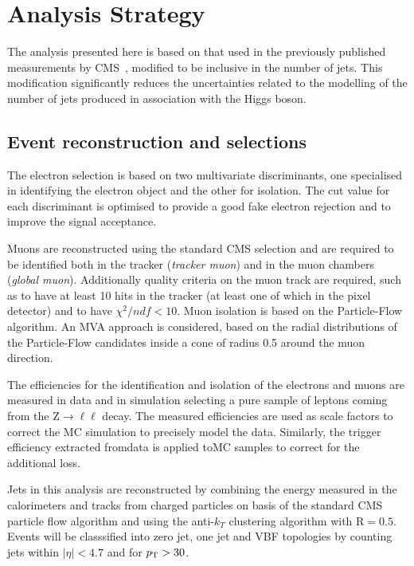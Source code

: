 \section{Analysis Strategy}
\label{sec:AnalysisStrategy}

The analysis presented here is based on that used in the previously published \hwwllnn{}
measurements by CMS~\cite{Chatrchyan:2013iaa}, modified to be inclusive in the number of jets. 
This modification significantly reduces the uncertainties related to the modelling of the number of jets produced in association with the Higgs boson.


\subsection{Event reconstruction and selections}\label{sec:Selections}

The electron selection is based on two multivariate discriminants, one specialised in identifying the electron object and the other for isolation. The cut value for each discriminant is optimised to provide a good fake electron rejection and to improve the signal acceptance.

Muons are reconstructed using the standard CMS selection and are required to be identified both in the tracker (\textit{tracker muon}) and in the muon chambers (\textit{global muon}). Additionally quality criteria on the muon track are required, such as to have at least 10 hits in the tracker (at least one of which in the pixel detector) and to have $\chi^2/ndf < 10$.
Muon isolation is based on the Particle-Flow algorithm. An MVA approach is considered, based on the radial distributions of the Particle-Flow candidates inside a cone of radius 0.5 around the muon direction.

The efficiencies for the identification and isolation of the electrons and muons are measured in data and in simulation selecting a pure sample of leptons coming from the Z$\to\ell\ell$ decay. The measured efficiencies are used as scale factors to correct the MC simulation to precisely model the data. Similarly, the trigger efficiency extracted fromdata is applied toMC samples to correct for the additional loss.

Jets in this analysis are reconstructed by combining the energy measured in the calorimeters and tracks from charged particles on basis of the standard CMS particle flow algorithm and using the anti-$k_T$ clustering algorithm with $\mathrm{R} = 0.5$. Events will be classsified into zero jet, one jet and VBF topologies by counting jets within $|\eta| < 4.7$ and for $p_\mathrm{T} > 30$\GeV.

